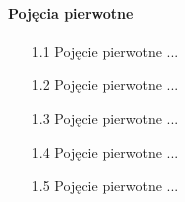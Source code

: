 \paragraph{Pojęcia pierwotne}	
\begin{enumerate}	
    \item [1.1] Pojęcie pierwotne ... %
    \item [1.2] Pojęcie pierwotne ... %
    \item [1.3] Pojęcie pierwotne ... %
    \item [1.4] Pojęcie pierwotne ... %
    \item [1.5] Pojęcie pierwotne ... %
\end{enumerate}	
	

